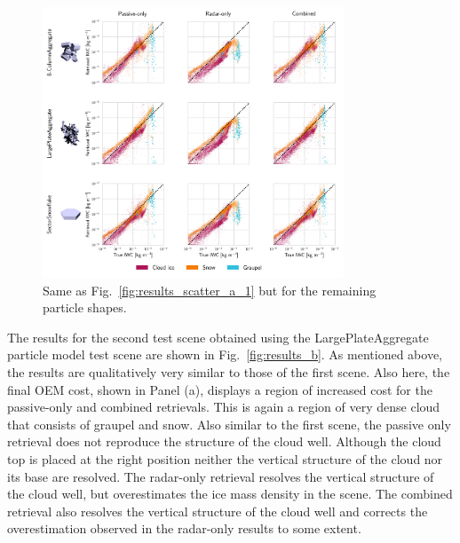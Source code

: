 \documentclass[journal abbreviation, manuscript]{copernicus}
\begin{document}
\begin{figure}
\centering
\includegraphics[width = 0.8\textwidth]{../plots/results_scatter_a_2}
\caption{Same as Fig.~\ref{fig:results_scatter_a_1} but for the remaining particle
  shapes.}
\label{fig:results_scatter_a_2}
\end{figure}


The results for the second test scene obtained using the LargePlateAggregate
particle model test scene are shown in Fig.~\ref{fig:results_b}. As mentioned
above, the results are qualitatively very similar to those of the first scene.
Also here, the final OEM cost, shown in Panel (a), displays a region of
increased cost for the passive-only and combined retrievals. This is again a
region of very dense cloud that consists of graupel and snow. Also similar to
the first scene, the passive only retrieval does not reproduce the structure of
the cloud well. Although the cloud top is placed at the right position neither
the vertical structure of the cloud nor its base are resolved. The radar-only
retrieval resolves the vertical structure of the cloud well, but overestimates
the ice mass density in the scene. The combined retrieval also resolves the
vertical structure of the cloud well and corrects the overestimation observed
in the radar-only results to some extent.
\end{document}
